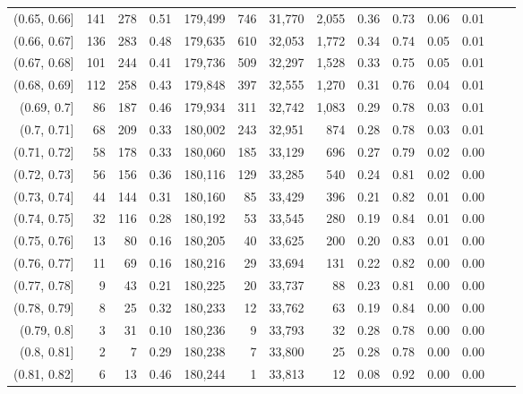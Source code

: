 \begin{tabular}{rrrrrrrrrrrrrr}
(0.65, 0.66]   &    141 &  278 &    0.51 &  179,499 &      746 &  31,770 &   2,055 &  0.36 &  0.73 &  0.06 &      0.01 \\
(0.66, 0.67]   &    136 &  283 &    0.48 &  179,635 &      610 &  32,053 &   1,772 &  0.34 &  0.74 &  0.05 &      0.01 \\
(0.67, 0.68]   &    101 &  244 &    0.41 &  179,736 &      509 &  32,297 &   1,528 &  0.33 &  0.75 &  0.05 &      0.01 \\
(0.68, 0.69]   &    112 &  258 &    0.43 &  179,848 &      397 &  32,555 &   1,270 &  0.31 &  0.76 &  0.04 &      0.01 \\
(0.69, 0.7]    &     86 &  187 &    0.46 &  179,934 &      311 &  32,742 &   1,083 &  0.29 &  0.78 &  0.03 &      0.01 \\
(0.7, 0.71]    &     68 &  209 &    0.33 &  180,002 &      243 &  32,951 &     874 &  0.28 &  0.78 &  0.03 &      0.01 \\
(0.71, 0.72]   &     58 &  178 &    0.33 &  180,060 &      185 &  33,129 &     696 &  0.27 &  0.79 &  0.02 &      0.00 \\
(0.72, 0.73]   &     56 &  156 &    0.36 &  180,116 &      129 &  33,285 &     540 &  0.24 &  0.81 &  0.02 &      0.00 \\
(0.73, 0.74]   &     44 &  144 &    0.31 &  180,160 &       85 &  33,429 &     396 &  0.21 &  0.82 &  0.01 &      0.00 \\
(0.74, 0.75]   &     32 &  116 &    0.28 &  180,192 &       53 &  33,545 &     280 &  0.19 &  0.84 &  0.01 &      0.00 \\
(0.75, 0.76]   &     13 &   80 &    0.16 &  180,205 &       40 &  33,625 &     200 &  0.20 &  0.83 &  0.01 &      0.00 \\
(0.76, 0.77]   &     11 &   69 &    0.16 &  180,216 &       29 &  33,694 &     131 &  0.22 &  0.82 &  0.00 &      0.00 \\
(0.77, 0.78]   &      9 &   43 &    0.21 &  180,225 &       20 &  33,737 &      88 &  0.23 &  0.81 &  0.00 &      0.00 \\
(0.78, 0.79]   &      8 &   25 &    0.32 &  180,233 &       12 &  33,762 &      63 &  0.19 &  0.84 &  0.00 &      0.00 \\
(0.79, 0.8]    &      3 &   31 &    0.10 &  180,236 &        9 &  33,793 &      32 &  0.28 &  0.78 &  0.00 &      0.00 \\
(0.8, 0.81]    &      2 &    7 &    0.29 &  180,238 &        7 &  33,800 &      25 &  0.28 &  0.78 &  0.00 &      0.00 \\
(0.81, 0.82]   &      6 &   13 &    0.46 &  180,244 &        1 &  33,813 &      12 &  0.08 &  0.92 &  0.00 &      0.00 \\

\end{tabular}
